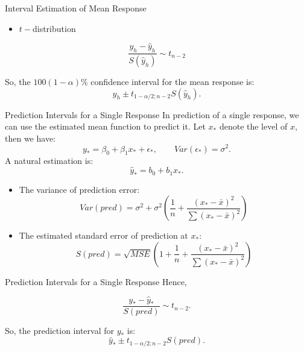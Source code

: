 \documentclass[
  ignorenonframetext,
]{beamer}
\providecommand{\tightlist}{%
  \setlength{\itemsep}{0pt}\setlength{\parskip}{0pt}}
\begin{document}
\begin{frame}{Interval Estimation of Mean Response}
\protect{}\label{interval-estimation-of-mean-response-1}
\begin{itemize}
\tightlist
\item
  \(t-\)distribution
\end{itemize}

\[\frac{y_h-\hat{y}_h}{S(\hat{y}_h)}\sim t_{n-2}\]

So, the \(100(1-\alpha)\%\) confidence interval for the mean response
is: \[\hat{y}_h\pm t_{1 -\alpha/2; n-2}S(\hat{y}_h).\]
\end{frame}

\begin{frame}{Prediction Intervals for a Single Response}
\protect{}\label{prediction-intervals-for-a-single-response}
In prediction of a single response, we can use the estimated mean
function to predict it. Let \(x_*\) denote the level of \(x\), then we
have:
\[ y_*=\beta_0+\beta_1x_*+\epsilon_*, \quad \quad Var(\epsilon_*)=\sigma^2.\]
A natural estimation is: \[ \hat{y}_*=b_0+b_1x_*.\]

\begin{itemize}
\tightlist
\item
  The variance of prediction error:
  \[ Var(pred)=\sigma^2+\sigma^2\left(\frac{1}{n}+\frac{(x_* -\bar{x})^2}{\sum (x_* -\bar{x})^2}\right)\]
\item
  The estimated standard error of prediction at \(x_*\):
  \[S(pred)=\sqrt{MSE}\left(1+\frac{1}{n}+\frac{(x_* -\bar{x})^2}{\sum (x_* -\bar{x})^2}\right)\]
\end{itemize}
\end{frame}

\begin{frame}{Prediction Intervals for a Single Response}
\protect{}\label{prediction-intervals-for-a-single-response-1}
Hence,

\[\frac{y_*-\hat{y}_*}{S(pred)}\sim t_{n-2}.\]

So, the prediction interval for \(y_*\) is:
\[\hat{y}_*\pm t_{1 - \alpha/2; n-2}S(pred).\]
\end{frame}
\end{document}
